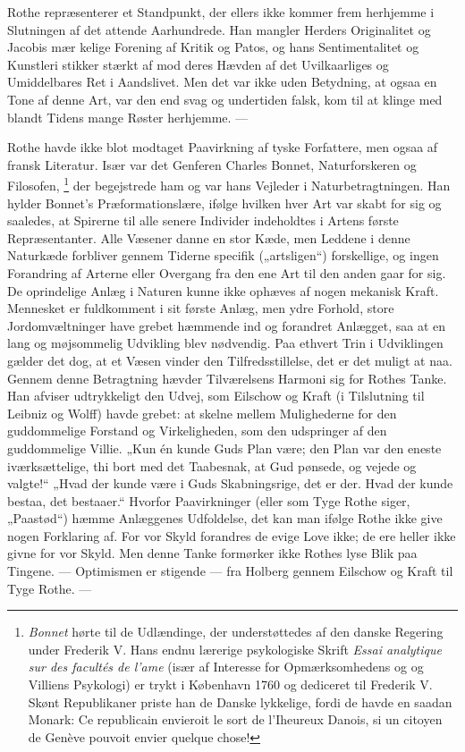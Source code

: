 \documentclass[12pt,a4paper,openany]{book}
\newcommand{\opage}[1]{\marginnote{\footnotesize\textit{[#1]}}}
\begin{document}
Rothe repræsenterer et Standpunkt, der ellers ikke kommer frem herhjemme i
Slutningen af det attende Aarhundrede. Han mangler Herders Originalitet og
Jacobis mær%
\setcounter{footnote}{0}%
\opage{32}kelige Forening af Kritik og Patos, og hans Sentimentalitet og
Kunstleri stikker stærkt af mod deres Hævden af det Uvilkaarliges og
Umiddelbares Ret i Aandslivet. Men det var ikke uden Betydning, at ogsaa en
Tone af denne Art, var den end svag og undertiden falsk, kom til at klinge med
blandt Tidens mange Røster herhjemme. ---

Rothe havde ikke blot modtaget Paavirkning af tyske Forfattere, men ogsaa af
fransk Literatur. Især var det Genferen Charles Bonnet, Naturforskeren og Filosofen,%
\footnote[1]{\emph{Bonnet} hørte til de Udlændinge, der understøttedes af den
danske Regering under Frederik V. Hans endnu lærerige psykologiske Skrift
\textit{Essai analytique sur des facultés de l'ame} (især af Interesse for
Opmærksomhedens og og Villiens Psykologi) er trykt i København 1760 og
dediceret til Frederik V. Skønt Republikaner priste han de Danske lykkelige,
fordi de havde en saadan Monark: Ce republicain envieroit le sort de l'Iheureux
Danois, si un citoyen de Genève pouvoit envier quelque chose!} der begejstrede
ham og var hans Vejleder i Naturbetragtningen. Han hylder Bonnet's
Præformationslære, ifølge hvilken hver Art var skabt for sig og saaledes, at
Spirerne til alle senere Individer indeholdtes i Artens første Repræsentanter.
Alle Væsener danne en stor Kæde, men Leddene i denne Naturkæde forbliver gennem
Tiderne specifik („artsligen“) forskellige, og ingen Forandring af Arterne
eller Overgang fra den ene Art til den anden gaar for sig. De oprindelige Anlæg
i Naturen kunne ikke ophæves af nogen mekanisk Kraft. Mennesket er fuldkomment
i sit første Anlæg, men ydre Forhold, store Jordomvæltninger have grebet
hæmmende ind og forandret Anlægget, saa at en lang og møjsommelig Udvikling
blev nødvendig. Paa ethvert Trin i Udviklingen gælder det dog, at et Væsen
vinder den Tilfredsstillelse, det er det muligt at naa. Gennem denne
Betragtning hævder Tilværelsens Harmoni sig for Rothes Tanke. Han afviser
udtrykkeligt den Udvej, som Eilschow og Kraft (i Tilslutning til Leibniz og
Wolff) havde grebet: at skelne mellem Mulighederne for den guddommelige
Forstand og Virkeligheden, som den udspringer af den guddommelige Villie. „Kun
én kunde Guds Plan være; den Plan var den eneste iværksættelige, thi
\setcounter{footnote}{0}%
\opage{33}bort med det Taabesnak, at Gud pønsede, og vejede og valgte!“ „Hvad
der kunde være i Guds Skabningsrige, det er der. Hvad der kunde bestaa, det
bestaaer.“ Hvorfor Paavirkninger (eller som Tyge Rothe siger, „Paastød“) hæmme
Anlæggenes Udfoldelse, det kan man ifølge Rothe ikke give nogen Forklaring af.
For vor Skyld forandres de evige Love ikke; de ere heller ikke givne for vor
Skyld. Men denne Tanke formørker ikke Rothes lyse Blik paa Tingene. ---
Optimismen er stigende --- fra Holberg gennem Eilschow og Kraft til Tyge Rothe. ---
\end{document}
